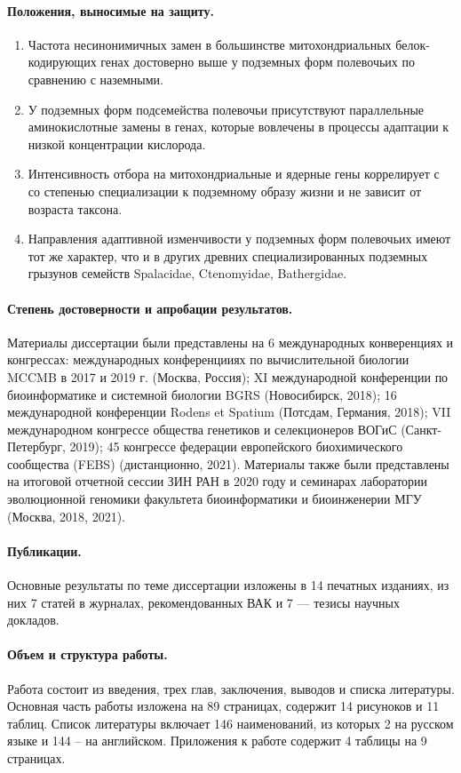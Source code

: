 \paragraph{Положения, выносимые на защиту.}
\begin{enumerate}
	\item Частота несинонимичных замен в большинстве митохондриальных белок-кодирующих генах достоверно выше у подземных форм полевочьих по сравнению с наземными. 
	\item У подземных форм подсемейства полевочьи присутствуют параллельные аминокислотные замены в генах, которые вовлечены в процессы адаптации к низкой концентрации кислорода.
	\item Интенсивность отбора на митохондриальные и ядерные гены коррелирует с со степенью специализации к подземному образу жизни и не зависит от возраста таксона.
	\item Направления адаптивной изменчивости у подземных форм полевочьих имеют тот же характер, что и в других древних специализированных подземных грызунов семейств Spalacidae, Ctenomyidae, Bathergidae.
\end{enumerate}

\paragraph{Степень достоверности и апробации результатов.} Материалы диссертации были представлены на 6 международных конверенциях и конгрессах: международных конференцииях по вычислительной биологии MCCMB в 2017 и 2019 г. (Москва, Россия); XI международной конференции по биоинформатике и системной биологии BGRS (Новосибирск, 2018); 16 международной конференции Rodens et Spatium (Потсдам, Германия, 2018); VII международном конгрессе общества генетиков и селекционеров ВОГиС (Санкт-Петербург, 2019); 45 конгрессе федерации европейского биохимического сообщества (FEBS) (дистанционно, 2021). Материалы также были представлены на итоговой отчетной сессии ЗИН РАН в 2020 году и семинарах лаборатории эволюционной геномики факультета биоинформатики и биоинженерии МГУ (Москва, 2018, 2021).

\paragraph{Публикации.} Основные результаты по теме диссертации изложены в 14 печатных изданиях, из них 7 статей в журналах, рекомендованных ВАК и 7 --- тезисы научных докладов.

\paragraph{Объем и структура работы.} Работа состоит из введения, трех глав, заключения, выводов и списка литературы. Основная часть работы изложена на 89 страницах, содержит 14 рисуноков и 11 таблиц. Список литературы включает 146 наименований, из которых 2 на русском языке и 144 -- на английском. Приложения к работе содержит 4 таблицы на 9 страницах.

